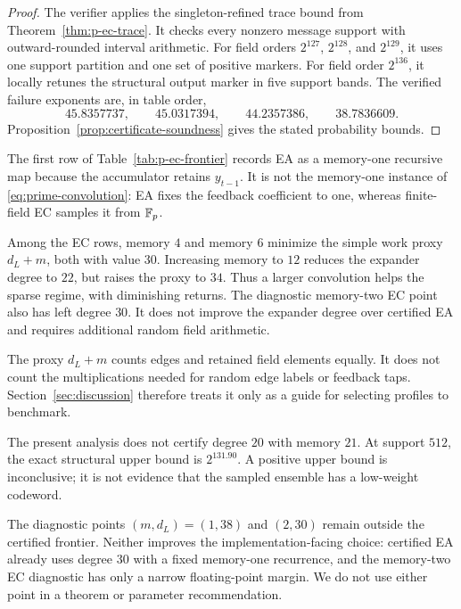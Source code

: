 \begin{proof}
The verifier applies the singleton-refined trace bound from
Theorem~\ref{thm:p-ec-trace}.  It checks every nonzero message support with
outward-rounded interval arithmetic.  For field orders $2^{127}$,
$2^{128}$, and $2^{129}$, it uses one support partition and one set of
positive markers.  For field order $2^{136}$, it locally retunes the
structural output marker in five support bands.  The verified failure
exponents are, in table order,
\[
 45.8357737,\qquad 45.0317394,\qquad
 44.2357386,\qquad 38.7836609.
\]
Proposition~\ref{prop:certificate-soundness} gives the stated probability
bounds.
\end{proof}

The first row of Table~\ref{tab:p-ec-frontier} records EA as a memory-one
recursive map because the accumulator retains $y_{t-1}$.  It is not the
memory-one instance of \eqref{eq:prime-convolution}: EA fixes the feedback
coefficient to one, whereas finite-field EC samples it from $\mathbb F_p$.

Among the EC rows, memory $4$ and memory $6$ minimize the simple work proxy
$d_L+m$, both with value $30$.  Increasing memory to $12$ reduces the
expander degree to $22$, but raises the proxy to $34$.  Thus a larger
convolution helps the sparse regime, with diminishing returns.  The
diagnostic memory-two EC point also has left degree $30$.  It does not improve
the expander degree over certified EA and requires additional random field
arithmetic.

The proxy $d_L+m$ counts edges and retained field elements equally.  It does
not count the multiplications needed for random edge labels or feedback taps.
Section~\ref{sec:discussion} therefore treats it only as a guide for selecting
profiles to benchmark.

The present analysis does not certify degree $20$ with memory $21$.  At
support $512$, the exact structural upper bound is $2^{131.90}$.  A positive
upper bound is inconclusive; it is not evidence that the sampled ensemble has
a low-weight codeword.

The diagnostic points $(m,d_L)=(1,38)$ and $(2,30)$ remain outside the
certified frontier.  Neither improves the implementation-facing choice:
certified EA already uses degree $30$ with a fixed memory-one recurrence, and
the memory-two EC diagnostic has only a narrow floating-point margin.  We do
not use either point in a theorem or parameter recommendation.
